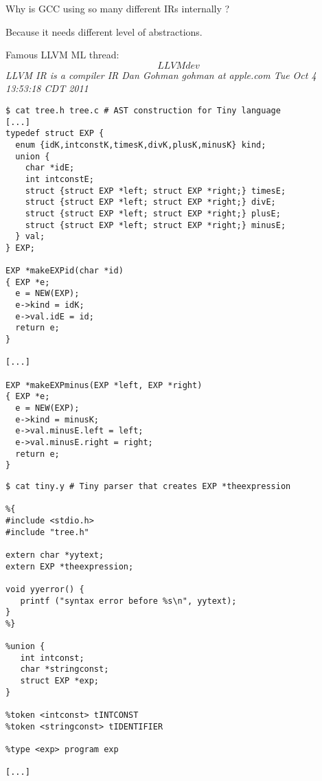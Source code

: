 \begin{slide*}
    Why is GCC using so many different IRs internally ?

    Because it needs different level of abstractions.

    Famous LLVM ML thread:
    \emph{
    \[LLVMdev\] LLVM IR is a compiler IR
    Dan Gohman gohman at apple.com
    Tue Oct 4 13:53:18 CDT 2011}

\end{slide*}

\begin{slide*}
\begin{scriptsize}
\begin{verbatim}
$ cat tree.h tree.c # AST construction for Tiny language
[...]
typedef struct EXP {
  enum {idK,intconstK,timesK,divK,plusK,minusK} kind;
  union {
    char *idE;
    int intconstE;
    struct {struct EXP *left; struct EXP *right;} timesE;
    struct {struct EXP *left; struct EXP *right;} divE;
    struct {struct EXP *left; struct EXP *right;} plusE;
    struct {struct EXP *left; struct EXP *right;} minusE;
  } val;  
} EXP;

EXP *makeEXPid(char *id)
{ EXP *e;
  e = NEW(EXP);
  e->kind = idK;
  e->val.idE = id;
  return e;
}

[...]

EXP *makeEXPminus(EXP *left, EXP *right)
{ EXP *e;  
  e = NEW(EXP);
  e->kind = minusK;
  e->val.minusE.left = left;
  e->val.minusE.right = right;
  return e;
}
\end{verbatim}
\end{scriptsize}
\vfil
\end{slide*}
 
\begin{slide*}
\begin{scriptsize}
\begin{verbatim}
$ cat tiny.y # Tiny parser that creates EXP *theexpression

%{
#include <stdio.h>
#include "tree.h"

extern char *yytext;
extern EXP *theexpression;

void yyerror() {
   printf ("syntax error before %s\n", yytext);
}
%}

%union {
   int intconst;
   char *stringconst;
   struct EXP *exp;
}

%token <intconst> tINTCONST
%token <stringconst> tIDENTIFIER 

%type <exp> program exp

[...]
\end{verbatim}
\end{scriptsize}
\vfil
\end{slide*}
 
